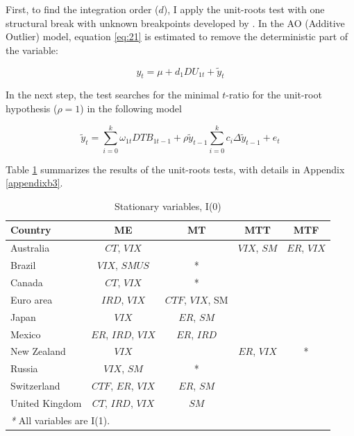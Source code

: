 \documentclass[a4paper, twoside]{templates/ociamthesis}
\begin{document}
First, to find the integration order (\(d\)), I apply the unit-roots test with one structural break with unknown breakpoints developed by \textcite{clemente1998}. In the AO (Additive Outlier) model, equation \eqref{eq:21} is estimated to remove the deterministic part of the variable:

\begin{equation}
y_t = \mu + d_1DU_{1t} + \widetilde{y}_t
\label{eq:21}
\end{equation}

In the next step, the test searches for the minimal \(t\)-ratio for the unit-root hypothesis (\(\rho=1\)) in the following model

\begin{equation}
\widetilde{y}_t = \sum_{i=0}^k\omega_{1t}DTB_{1t-1} + \rho\widetilde{y}_{t-1}\sum_{i=0}^kc_i\Delta\widetilde{y}_{t-1} + e_t
\end{equation}

Table \ref{tab:Table35} summarizes the results of the unit-roots tests, with details in Appendix \ref{appendixb3}.

\begin{table}[ht]

\caption{\label{tab:Table35}Stationary variables, I(0)}
\centering
\fontsize{10}{12}\selectfont
\begin{tabular}[t]{lcccc}
\toprule
\textbf{Country} & \textbf{ME} & \textbf{MT} & \textbf{MTT} & \textbf{MTF}\\
\midrule
Australia & $CT$, $VIX$ &  & $VIX$, $SM$ & $ER$, $VIX$\\
Brazil & $VIX$, $SMUS$ & * &  & \\
Canada & $CT$, $VIX$ & * &  & \\
Euro area & $IRD$, $VIX$ & $CTF$, $VIX$, SM &  & \\
Japan & $VIX$ & $ER$, $SM$ &  & \\
Mexico & $ER$, $IRD$, $VIX$ & $ER$, $IRD$ &  & \\
New Zealand & $VIX$ &  & $ER$, $VIX$ & *\\
Russia & $VIX$, $SM$ & * &  & \\
Switzerland & $CTF$, $ER$, $VIX$ & $ER$, $SM$ &  & \\
United Kingdom & $CT$, $IRD$, $VIX$ & $SM$ &  & \\
\bottomrule
\multicolumn{5}{l}{\rule{0pt}{1em}\textit{\footnotesize{*}} \footnotesize{All variables are I(1).}}\\
\end{tabular}
\end{table}
\end{document}
